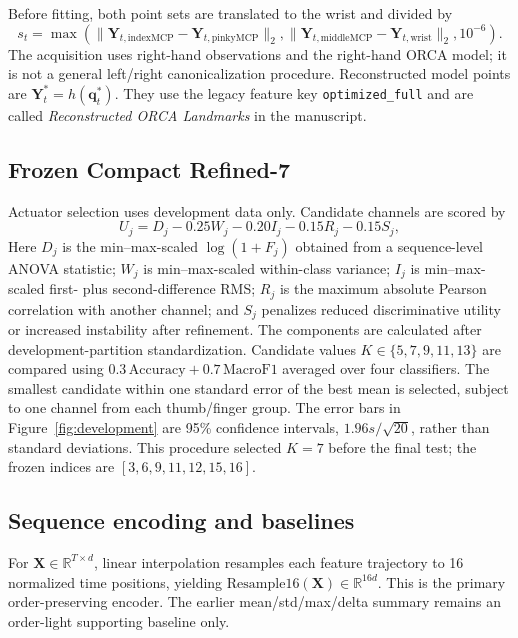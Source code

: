 \documentclass[11pt]{article}
\begin{document}
Before fitting, both point sets are translated to the wrist and divided by
\begin{equation}
s_t=\max\left(\|\mathbf Y_{t,\mathrm{indexMCP}}-\mathbf Y_{t,\mathrm{pinkyMCP}}\|_2,
\|\mathbf Y_{t,\mathrm{middleMCP}}-\mathbf Y_{t,\mathrm{wrist}}\|_2,10^{-6}\right).
\end{equation}
The acquisition uses right-hand observations and the right-hand ORCA model; it is not a general left/right canonicalization procedure. Reconstructed model points are $\mathbf Y_t^*=h(\mathbf q_t^*)$. They use the legacy feature key \texttt{optimized\_full} and are called \emph{Reconstructed ORCA Landmarks} in the manuscript.

\subsection{Frozen Compact Refined-7}
Actuator selection uses development data only. Candidate channels are scored by
\begin{equation}
U_j=D_j-0.25W_j-0.20I_j-0.15R_j-0.15S_j,
\end{equation}
Here $D_j$ is the min--max-scaled $\log(1+F_j)$ obtained from a sequence-level ANOVA statistic; $W_j$ is min--max-scaled within-class variance; $I_j$ is min--max-scaled first- plus second-difference RMS; $R_j$ is the maximum absolute Pearson correlation with another channel; and $S_j$ penalizes reduced discriminative utility or increased instability after refinement. The components are calculated after development-partition standardization. Candidate values $K\in\{5,7,9,11,13\}$ are compared using $0.3\,\mathrm{Accuracy}+0.7\,\mathrm{MacroF1}$ averaged over four classifiers. The smallest candidate within one standard error of the best mean is selected, subject to one channel from each thumb/finger group. The error bars in Figure~\ref{fig:development} are 95\% confidence intervals, $1.96s/\sqrt{20}$, rather than standard deviations. This procedure selected $K=7$ before the final test; the frozen indices are $[3,6,9,11,12,15,16]$.

\begin{table}[t]
\centering
\caption{Frozen Compact Refined-7 channels.}
\label{tab:compact7}
\scriptsize

\end{table}

\subsection{Sequence encoding and baselines}
For $\mathbf X\in\mathbb R^{T\times d}$, linear interpolation resamples each feature trajectory to 16 normalized time positions, yielding $\mathrm{Resample16}(\mathbf X)\in\mathbb R^{16d}$. This is the primary order-preserving encoder. The earlier mean/std/max/delta summary remains an order-light supporting baseline only.
\end{document}
